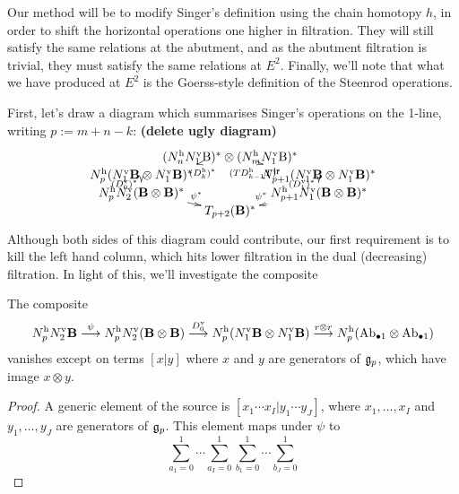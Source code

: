 \documentclass[10pt]{article}
\begin{document}
\begin{Lie Steenrods satisfy the Adem relation}
Our method will be to modify Singer's definition using the chain homotopy $h$, in order to shift the horizontal operations one higher in filtration. They will still satisfy the same relations at the abutment, and as the abutment filtration is trivial, they must satisfy the same relations at $E^2$. Finally, we'll note that what we have produced at $E^2$ is the Goerss-style definition of the Steenrod operations.

\begin{shaded}\tiny
First, let's draw a diagram which summarises Singer's operations on the 1-line, writing $p:=m+n-k$: \textbf{(delete ugly diagram)}
\[\xymatrix@R=5mm@!0@C=25mm{
&
(N^\textup{h}_nN^\textup{v}_1\textup{B})^*\otimes (N^\textup{h}_mN^\textup{v}_1\textup{B})^*
\ar[dr]_(.35){(TD_{k-1}^\textup{h}T)^*}
\ar[dl]^(.35){(D_{k}^\textup{h})^*}
&%
\\%
N_{p}^\textup{h}(N_1^\textup{v}\textbf{B}\otimes N_1^\textup{v}\textbf{B})^*\ar[d]^-{(D_0^\textup{v})^*}
&%
&%
N_{p+1}^\textup{h}(N_1^\textup{v}\textbf{B}\otimes N_1^\textup{v}\textbf{B})^*\ar[d]^-{(D_1^\textup{v})^*}\\%
N_{p}^\textup{h}N_2^\textup{v}(\textbf{B}\otimes\textbf{B})^*\ar[dr]^-{\psi^*}
&%
&%
N_{p+1}^\textup{h}N_1^\textup{v}(\textbf{B}\otimes\textbf{B})^*\ar[dl]_-{\psi^*}\\%
&%
T_{p+2}(\textbf{B})^*&%
}\]
Although both sides of this diagram could contribute, our first requirement is to kill the left hand column, which hits lower filtration in the dual (decreasing) filtration. In light of this, we'll investigate the composite
\end{shaded}
\begin{lem}\label{firstCompositeLemma}
The composite
\[N_{p}^\textup{h}N_2^\textup{v}\textbf{B}\overset{\psi}{\to} N_{p}^\textup{h}N_2^\textup{v}(\textbf{B}\otimes\textbf{B})\overset{D_0^\textup{v}}{\to} N_{p}^\textup{h}(N_1^\textup{v}\textbf{B}\otimes N_1^\textup{v}\textbf{B})\overset{r\otimes r}{\to}N^\textup{h}_p(\textup{Ab}_{\bullet 1}\otimes \textup{Ab}_{\bullet 1})\]
vanishes except on terms $[x|y]$ where $x$ and $y$ are generators of $\frakg_p$, which have image $x\otimes y$.
\end{lem}
\begin{proof}
A generic element of the source is $[x_1\cdots x_I|y_1\cdots y_J]$, where $x_1,\ldots,x_I$ and $y_1,\ldots,y_J$ are generators of $\frakg_p$. This element maps under $\psi$ to
\[\sum_{a_1=0}^1\cdots \sum_{a_I=0}^1
\sum_{b_1=0}^1\cdots \sum_{b_J=0}^1
\]
\end{proof}
\end{Lie Steenrods satisfy the Adem relation}
\end{document}
